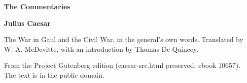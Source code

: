 \documentclass[11pt,letterpaper]{article}
\begin{document}
\color{ink}

\begin{titlepage}
\centering
\vspace*{4em}
{\LARGE\bfseries\color{heading} The Commentaries\par}
\vspace{2em}
{\Large\bfseries\color{heading} Julius Caesar\par}
\vspace{2.5em}
{\itshape\color{subhead}\parbox{0.8\linewidth}{\centering The War in Gaul and the Civil War, in the general's own words. Translated by W. A. McDevitte, with an introduction by Thomas De Quincey.\par}}
\vfill
{\small From the Project Gutenberg edition (caesar-src.html preserved; ebook 10657). The text is in the public domain.\par}
\vspace{2em}
\end{titlepage}

\tableofcontents


\end{document}
